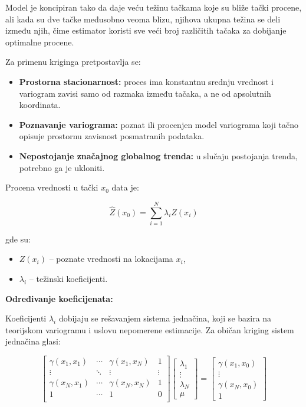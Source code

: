 \documentclass[12pt]{article}
\begin{document}
Model je koncipiran tako da daje veću težinu tačkama koje su bliže tački procene, ali kada su dve tačke međusobno veoma blizu, njihova ukupna težina se deli između njih, čime estimator koristi sve veći broj različitih tačaka za dobijanje optimalne procene.

Za primenu kriginga pretpostavlja se:

\begin{itemize}
\item \textbf{Prostorna stacionarnost:} proces ima konstantnu srednju vrednost i variogram zavisi samo od razmaka između tačaka, a ne od apsolutnih koordinata.
\item \textbf{Poznavanje variograma:} poznat ili procenjen model variograma koji tačno opisuje prostornu zavisnost posmatranih podataka.
\item \textbf{Nepostojanje značajnog globalnog trenda:} u slučaju postojanja trenda, potrebno ga je ukloniti.
\end{itemize}

Procena vrednosti u tački $x_0$ data je:

\begin{equation}
\hat{Z}(x_0) = \sum_{i=1}^{N} \lambda_i Z(x_i)
\end{equation}

gde su:
\begin{itemize}
    \item $Z(x_i)$ -- poznate vrednosti na lokacijama $x_i$,
    \item $\lambda_i$ -- težinski koeficijenti.
\end{itemize}

\textbf{Određivanje koeficijenata:}

Koeficijenti $\lambda_i$ dobijaju se rešavanjem sistema jednačina, koji se bazira na teorijskom variogramu i uslovu nepomerene estimacije. Za običan kriging sistem jednačina glasi:

\begin{equation}
\begin{bmatrix}
\gamma(x_1,x_1) & \cdots & \gamma(x_1,x_N) & 1 \\
\vdots & \ddots & \vdots & \vdots \\
\gamma(x_N,x_1) & \cdots & \gamma(x_N,x_N) & 1 \\
1 & \cdots & 1 & 0 \\
\end{bmatrix}
\begin{bmatrix}
\lambda_1 \\ \vdots \\ \lambda_N \\ \mu
\end{bmatrix}
=
\begin{bmatrix}
\gamma(x_1,x_0) \\ \vdots \\ \gamma(x_N,x_0) \\ 1
\end{bmatrix}
\end{equation}
\end{document}
